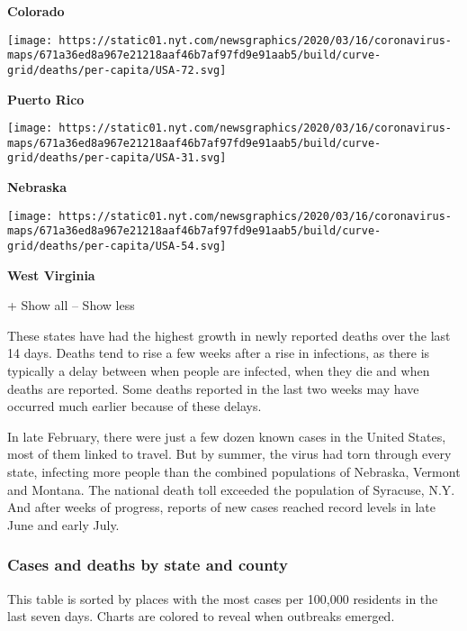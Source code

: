 \textbf{Colorado}

\href{https://www.nytimes.com/interactive/2020/us/puerto-rico-coronavirus-cases.html}{}

\texttt{[image: https://static01.nyt.com/newsgraphics/2020/03/16/coronavirus-maps/671a36ed8a967e21218aaf46b7af97fd9e91aab5/build/curve-grid/deaths/per-capita/USA-72.svg]}

\textbf{Puerto Rico}

\href{https://www.nytimes.com/interactive/2020/us/nebraska-coronavirus-cases.html}{}

\texttt{[image: https://static01.nyt.com/newsgraphics/2020/03/16/coronavirus-maps/671a36ed8a967e21218aaf46b7af97fd9e91aab5/build/curve-grid/deaths/per-capita/USA-31.svg]}

\textbf{Nebraska}

\href{https://www.nytimes.com/interactive/2020/us/west-virginia-coronavirus-cases.html}{}

\texttt{[image: https://static01.nyt.com/newsgraphics/2020/03/16/coronavirus-maps/671a36ed8a967e21218aaf46b7af97fd9e91aab5/build/curve-grid/deaths/per-capita/USA-54.svg]}

\textbf{West Virginia}

+ Show all -- Show less

These states have had the highest growth in newly reported deaths over
the last 14 days. Deaths tend to rise a few weeks after a rise in
infections, as there is typically a delay between when people are
infected, when they die and when deaths are reported. Some deaths
reported in the last two weeks may have occurred much earlier because of
these delays.

In late February, there were just a few dozen known cases in the United
States, most of them linked to travel. But by summer, the virus had torn
through every state, infecting more people than the combined populations
of Nebraska, Vermont and Montana. The national death toll exceeded the
population of Syracuse, N.Y. And after weeks of progress, reports of new
cases reached record levels in late June and early July.

\hypertarget{cases-and-deaths-by-state-and-county}{%
\subsubsection{Cases and deaths by state and
county}\label{cases-and-deaths-by-state-and-county}}

This table is sorted by places with the most cases per 100,000 residents
in the last seven days. Charts are colored to reveal when outbreaks
emerged.

